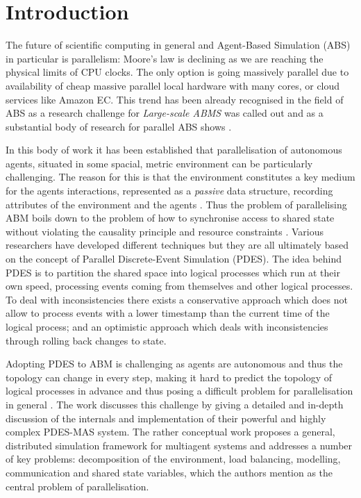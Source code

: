 \section{Introduction} %
The future of scientific computing in general and Agent-Based Simulation (ABS) in particular is parallelism: Moore's law is declining as we are reaching the physical limits of CPU clocks. The only option is going massively parallel due to availability of cheap massive parallel local hardware with many cores, or cloud services like Amazon EC. This trend has been already recognised in the field of ABS as a research challenge for \textit{Large-scale ABMS} \cite{macal_everything_2016} was called out and as a substantial body of research for parallel ABS shows \cite{suryanarayanan_pdes-mas_2013, logan_distributed_2001, lees_using_2008, suryanarayanan_synchronised_2013, riley_next_2003, gasser_mace3j:_2002, himmelspach_plugn_2007, minson_distributing_2008, gorur_repast_2016, hay_experiments_2015, abar_agent_2017, cicirelli_efficient_2015}.

In this body of work it has been established that parallelisation of autonomous agents, situated in some spacial, metric environment can be particularly challenging. The reason for this is that the environment constitutes a key medium for the agents interactions, represented as a \textit{passive} data structure, recording attributes of the environment and the agents \cite{lees_using_2008}. Thus the problem of parallelising ABM boils down to the problem of how to synchronise access to shared state without violating the causality principle and resource constraints \cite{logan_distributed_2001, suryanarayanan_pdes-mas_2013}. Various researchers have developed different techniques but they are all ultimately based on the concept of Parallel Discrete-Event Simulation (PDES). The idea behind PDES is to partition the shared space into logical processes which run at their own speed, processing events coming from themselves and other logical processes. To deal with inconsistencies there exists a conservative approach which does not allow to process events with a lower timestamp than the current time of the logical process; and an optimistic approach which deals with inconsistencies through rolling back changes to state.

Adopting PDES to ABM is challenging as agents are autonomous and thus the topology can change in every step, making it hard to predict the topology of logical processes in advance \cite{lees_using_2008} and thus posing a difficult problem for parallelisation in general \cite{cicirelli_efficient_2015}. The work \cite{suryanarayanan_pdes-mas_2013, suryanarayanan_synchronised_2013} discusses this challenge by giving a detailed and in-depth discussion of the internals and implementation of their powerful and highly complex PDES-MAS system. The rather conceptual work \cite{logan_distributed_2001} proposes a general, distributed simulation framework for multiagent systems and addresses a number of key problems: decomposition of the environment, load balancing, modelling, communication and shared state variables, which the authors mention as the central problem of parallelisation.

